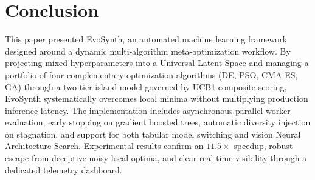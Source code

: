 \documentclass[conference]{IEEEtran}
\begin{document}
\section{Conclusion}
This paper presented EvoSynth, an automated machine learning framework designed around a dynamic multi-algorithm meta-optimization workflow. By projecting mixed hyperparameters into a Universal Latent Space and managing a portfolio of four complementary optimization algorithms (DE, PSO, CMA-ES, GA) through a two-tier island model governed by UCB1 composite scoring, EvoSynth systematically overcomes local minima without multiplying production inference latency. The implementation includes asynchronous parallel worker evaluation, early stopping on gradient boosted trees, automatic diversity injection on stagnation, and support for both tabular model switching and vision Neural Architecture Search. Experimental results confirm an $11.5\times$ speedup, robust escape from deceptive noisy local optima, and clear real-time visibility through a dedicated telemetry dashboard.
\end{document}
